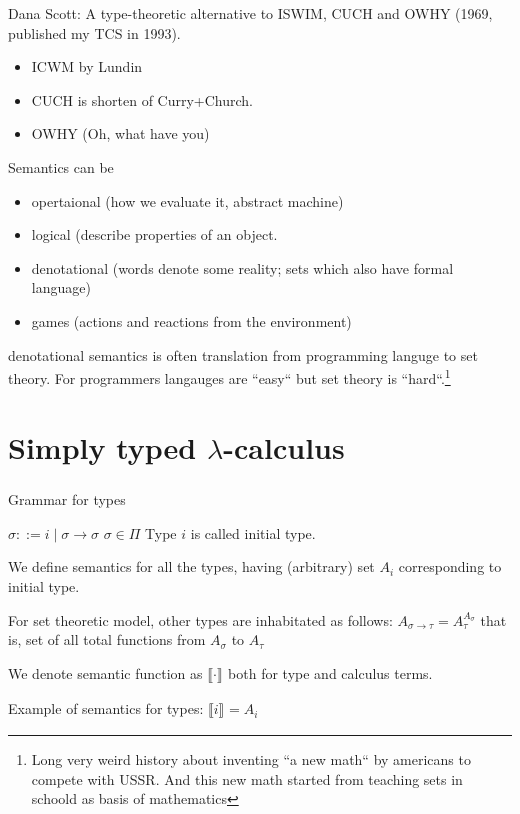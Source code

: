 \documentclass[a4paper,10pt]{book}
\newcommand{\sem}[2]{ \llbracket#1\rrbracket_{#2} }
\newcommand{\rarr}{ \rightarrow }
\begin{document}
Dana Scott:  A type-theoretic alternative to ISWIM, CUCH and OWHY (1969, published my TCS in 1993).

\begin{itemize}
\item ICWM by Lundin
\item CUCH is shorten of Curry+Church.
\item OWHY (Oh, what have you)
\end{itemize}

Semantics can be 
\begin{itemize}
\item opertaional (how we evaluate it, abstract machine)
\item logical (describe properties of an object.
\item denotational (words denote some reality; sets which also have formal language)
\item games (actions and reactions from the environment)
\end{itemize}

denotational semantics is often translation from programming languge to set theory. For programmers 
langauges are ``easy`` but set theory is ``hard``.\footnote{
Long very weird history about inventing ``a new math`` by americans to compete with USSR.
And this new math started from teaching sets in schoold as basis of mathematics}

\chapter{Simply typed $\lambda$-calculus}
\paragraph{}

Grammar for types

$\sigma ::= i \mid \sigma \rarr \sigma$
$ \sigma \in \Pi $
Type $ i $ is called initial type.

We define semantics for all the types, having (arbitrary) set $ A_i $ corresponding to initial type.

For set theoretic model, other types are inhabitated as follows: $ A_{\sigma \rightarrow \tau} = A_{\tau}^{A_\sigma}$ that is, set of all total functions from $ A_{\sigma} $ to $ A_{\tau} $


We denote semantic function as $\sem{\cdot}{}$ both for type and calculus terms.

Example of semantics for types: $\sem{i}{} = A_i $
\end{document}
